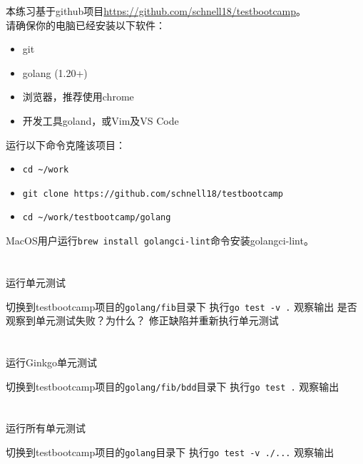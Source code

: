 \documentclass[12pt,addpoints,fleqn]{exam}
\begin{document}
\begin{questions}
\begin{parts}
本练习基于github项目\href{https://github.com/schnell18/testbootcamp}{https://github.com/schnell18/testbootcamp}。\\
请确保你的电脑已经安装以下软件：

\begin{itemize}
    \item git
    \item golang (1.20+)
    \item 浏览器，推荐使用chrome
    \item 开发工具goland，或Vim及VS Code
\end{itemize}

运行以下命令克隆该项目：
\begin{itemize}
    \item \verb=cd ~/work=
    \item \verb=git clone https://github.com/schnell18/testbootcamp=
    \item \verb=cd ~/work/testbootcamp/golang=
\end{itemize}

MacOS用户运行\verb=brew install golangci-lint=命令安装golangci-lint。

  \part{}运行单元测试
  \begin{subparts}
    \subpart{}切换到testbootcamp项目的\verb=golang/fib=目录下
    \subpart{}执行\verb=go test -v .=
    \subpart{}观察输出
    \subpart{}是否观察到单元测试失败？为什么？
    \subpart{}修正缺陷并重新执行单元测试
  \end{subparts}

  \part{}运行Ginkgo单元测试
  \begin{subparts}
    \subpart{}切换到testbootcamp项目的\verb=golang/fib/bdd=目录下
    \subpart{}执行\verb=go test .=
    \subpart{}观察输出
  \end{subparts}

  \part{}运行所有单元测试
  \begin{subparts}
    \subpart{}切换到testbootcamp项目的\verb=golang=目录下
    \subpart{}执行\verb=go test -v ./...=
    \subpart{}观察输出
  \end{subparts}


\end{parts}
\end{questions}
\end{document}
